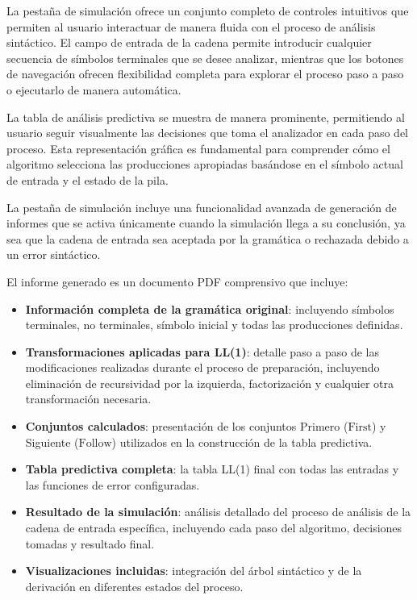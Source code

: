 La pestaña de simulación ofrece un conjunto completo de controles intuitivos que permiten al usuario interactuar de manera fluida con el proceso de análisis sintáctico. El campo de entrada de la cadena permite introducir cualquier secuencia de símbolos terminales que se desee analizar, mientras que los botones de navegación ofrecen flexibilidad completa para explorar el proceso paso a paso o ejecutarlo de manera automática.

La tabla de análisis predictiva se muestra de manera prominente, permitiendo al usuario seguir visualmente las decisiones que toma el analizador en cada paso del proceso. Esta representación gráfica es fundamental para comprender cómo el algoritmo selecciona las producciones apropiadas basándose en el símbolo actual de entrada y el estado de la pila.

La pestaña de simulación incluye una funcionalidad avanzada de generación de informes que se activa únicamente cuando la simulación llega a su conclusión, ya sea que la cadena de entrada sea aceptada por la gramática o rechazada debido a un error sintáctico.

El informe generado es un documento PDF comprensivo que incluye:

\begin{itemize}
 \item \textbf{Información completa de la gramática original}: incluyendo símbolos terminales, no terminales, símbolo inicial y todas las producciones definidas.

 \item \textbf{Transformaciones aplicadas para LL(1)}: detalle paso a paso de las modificaciones realizadas durante el proceso de preparación, incluyendo eliminación de recursividad por la izquierda, factorización y cualquier otra transformación necesaria.

 \item \textbf{Conjuntos calculados}: presentación de los conjuntos Primero ($\text{First}$) y Siguiente ($\text{Follow}$) utilizados en la construcción de la tabla predictiva.

 \item \textbf{Tabla predictiva completa}: la tabla LL(1) final con todas las entradas y las funciones de error configuradas.

 \item \textbf{Resultado de la simulación}: análisis detallado del proceso de análisis de la cadena de entrada específica, incluyendo cada paso del algoritmo, decisiones tomadas y resultado final.

 \item \textbf{Visualizaciones incluidas}: integración del árbol sintáctico y de la derivación en diferentes estados del proceso.
\end{itemize}

